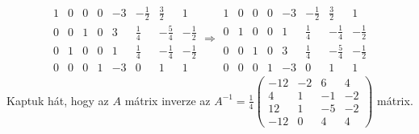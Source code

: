 \documentclass[9pt, a4paper, showtrims]{memoir}
\theoremstyle{plain}
\theoremstyle{remark}
\theoremstyle{definition}
\begin{document}
\begin{multline*}
    \begin{array}{cccc|cccc}
        1&0&0&0 & -3&-\frac{1}{2}&\frac{3}{2}&1\\
        0&0&1&0 & 3&\frac{1}{4}&-\frac{5}{4}&-\frac{1}{2}\\
        0&1&0&0 & 1&\frac{1}{4}&-\frac{1}{4}&-\frac{1}{2}\\
        0&0&0&1 & -3&0&1&1
    \end{array}\Rightarrow
    \begin{array}{cccc|cccc}
        1&0&0&0 & -3&-\frac{1}{2}&\frac{3}{2}&1\\
        0&1&0&0 & 1&\frac{1}{4}&-\frac{1}{4}&-\frac{1}{2}\\
        0&0&1&0 & 3&\frac{1}{4}&-\frac{5}{4}&-\frac{1}{2}\\
        0&0&0&1 & -3&0&1&1
    \end{array}
\end{multline*}
Kaptuk hát, hogy az $A$ mátrix inverze az
\begin{math}
    A^{-1}=\frac{1}{4}
    \begin{pmatrix}
        -12&-2&6&4\\
        4&1&-1&-2\\
        12&1&-5&-2\\
        -12&0&4&4
    \end{pmatrix}
\end{math}
mátrix.
\end{document}
